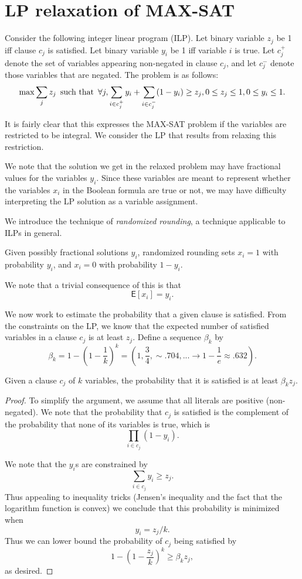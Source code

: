 \documentclass{article}
\newcommand{\E}{\mbox{$\mathsf E$}}
\begin{document}
\section{LP relaxation of MAX-SAT}

Consider the following integer linear program (ILP).  Let binary variable $z_j$ be 1 iff clause $c_j$ is satisfied.  Let binary variable $y_i$ be 1 iff variable $i$ is true.  Let $c_j^+$ denote the set of variables appearing non-negated in clause $c_j$, and let $c_j^-$ denote those variables that are negated.  The problem is as follows:
$$\max\sum_j z_j \textrm{\enspace such that\enspace} \forall j, \sum_{i\in c_j^+}y_i+\sum_{i\in c_j^-}(1-y_i)\geq z_j, 0\leq z_j\leq 1, 0\leq y_i\leq 1.$$

It is fairly clear that this expresses the MAX-SAT problem if the variables are restricted to be integral.  We consider the LP that results from relaxing this restriction.

We note that the solution we get in the relaxed problem may have fractional values for the variables $y_i$.  Since these variables are meant to represent whether the variables $x_i$ in the Boolean formula are true or not, we may have difficulty interpreting the LP solution as a variable assignment.

We introduce the technique of \emph{randomized rounding}, a technique applicable to ILPs in general.

Given possibly fractional solutions $y_i$, randomized rounding sets $x_i=1$ with probability $y_i$, and $x_i=0$ with probability $1-y_i$.

We note that a trivial consequence of this is that $$\E[x_i]=y_i.$$

We now work to estimate the probability that a given clause is satisfied.  From the constraints on the LP, we know that the expected number of satisfied variables in a clause $c_j$ is at least $z_j$.  Define a sequence $\beta_k$ by $$\beta_k=1-(1-\frac{1}{k})^k=(1,\frac{3}{4},\sim .704,...\rightarrow 1-\frac{1}{e}\approx .632).$$

\begin{claim}
Given a clause $c_j$ of $k$ variables, the probability that it is satisfied is at least $\beta_kz_j$.
\end{claim}

\begin{proof}
To simplify the argument, we assume that all literals are positive (non-negated).  We note that the probability that $c_j$ is satisfied is the complement of the probability that none of its variables is true, which is $$\prod_{i\in c_j}(1-y_i).$$

We note that the $y_i$s are constrained by $$\sum_{i\in c_j} y_i\geq z_j.$$  Thus appealing to inequality tricks (Jensen's inequality and the fact that the logarithm function is convex) we conclude that this probability is minimized when $$y_i=z_j/k.$$
Thus we can lower bound the probability of $c_j$ being satisfied by $$1-(1-\frac{z_j}{k})^k\geq\beta_kz_j,$$ as desired.
\end{proof}
\end{document}
